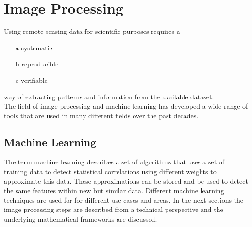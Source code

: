 \documentclass[12pt,a4paper, english,twoside]{article}
\begin{document}
\section{Image Processing}\label{sec:imgProcessing}
    Using remote sensing data for scientific purposes requires a 
    \begin{itemize} 
      \item[a] systematic
      \item[b] reproducible
      \item[c] verifiable 
    \end{itemize}%
    way of extracting patterns and information from the available dataset.\\
    The field of image processing and machine learning has developed a wide range of tools that are used in many different fields over the past decades. 

    \subsection{Machine Learning}\label{sec:ml}
    The term machine learning describes a set of algorithms that uses a set of training data to detect statistical correlations using different weights to approximate this data.
      These approximations can be stored and be used to detect the same features within new but similar data.
      Different machine learning techniques are used for for different use cases and areas.
      In the next sections the image processing steps are described from a technical perspective and the underlying mathematical frameworks are discussed.
%
\end{document}
